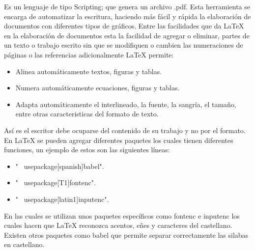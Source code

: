 \documentclass[conference,compsoc,onecolumn]{IEEEtran}
\begin{document}
Es un lenguaje de tipo Scripting; que genera un archivo .pdf. Esta herramienta se encarga de automatizar la escritura, haciendo más fácil y rápida la elaboración de documentos con diferentes tipos de gráficos.
Entre las facilidades que da \LaTeX{} en la elaboración de documentos esta la facilidad de agregar o eliminar, partes de un texto o trabajo escrito sin que se modifiquen o cambien las numeraciones de páginas o las referencias adicionalmente \LaTeX{} permite:
\begin{itemize}
    \item Alinea automáticamente textos, figuras y tablas.
    \item Numera automáticamente ecuaciones, figuras y tablas.
    \item Adapta automáticamente el interlineado, la fuente, la sangría, el tamaño, entre otras caracteristicas del formato de texto.
\end{itemize}

Así es el escritor debe ocuparse del contenido de su trabajo y no por el formato.
En \LaTeX{} se pueden agregar diferentes paquetes los cuales tienen diferentes funciones, un ejemplo de estos son las siguientes líneas:

\begin{itemize}
    \item " \ usepackage[spanish]{babel}".
    \item " \ usepackage[T1]{fontenc}". 
    \item " \ usepackage[latin1]{inputenc}".
\end{itemize}

En las cuales se utilizan unos paquetes específicos como fontenc e inputenc los cuales hacen que \LaTeX{} reconozca acentos, eñes y caracteres del castellano. Existen otros paquetes como babel que permite separar correctamente las silabas en castellano.
\end{document}
